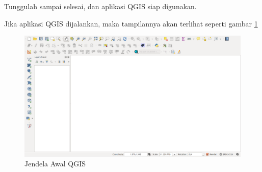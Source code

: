 \begin{enumerate}[A.]
\begin{enumerate}[1.]
Tunggulah sampai selesai, dan aplikasi QGIS siap digunakan. 
\end{enumerate}

Jika aplikasi QGIS dijalankan, maka tampilannya akan terlihat seperti gambar \ref{fig:tampilan-awal-qgis}

\begin{figure}
  \centering
  \includegraphics[width=1\textwidth]{./resources/003-jendela-awal-qgis}
  \caption{Jendela Awal QGIS}
  \label{fig:tampilan-awal-qgis}
\end{figure}

\end{enumerate}

